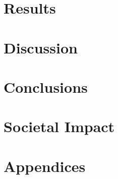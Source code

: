 \documentclass[a4paper, 10pt, openany]{book} %
\begin{document}
\chapter{Results}

\cleardoublepage


\chapter{Discussion}

\cleardoublepage


\chapter{Conclusions}

\cleardoublepage

\chapter{Societal Impact}

\cleardoublepage




\printbibliography[title={References}] %
\cleardoublepage


\chapter*{\LARGE \textbf{Appendices}}
\fancyhf{} %
\renewcommand{\headrulewidth}{0pt} %
\fancyfoot[C]{\thepage} %
\appendix



\glsaddallunused
\end{document}
